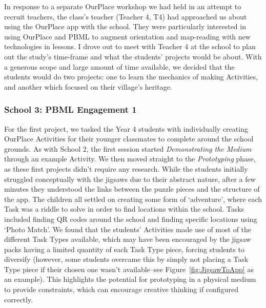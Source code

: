 In response to a separate OurPlace workshop we had held in an attempt to recruit teachers, the class's teacher (Teacher 4, T4) had approached us about using the OurPlace app with the school. They were particularly interested in using OurPlace and PBML to augment orientation and map-reading with new technologies in lessons. I drove out to meet with Teacher 4 at the school to plan out the study's time-frame and what the students' projects would be about. With a generous scope and large amount of time available, we decided that the students would do two projects: one to learn the mechanics of making Activities, and another which focused on their village's heritage. 

\subsubsection{School 3: PBML Engagement 1}
For the first project, we tasked the Year 4 students with individually creating OurPlace Activities for their younger classmates to complete around the school grounds. As with School 2, the first session started \textit{Demonstrating the Medium} through an example Activity. We then moved straight to the \textit{Prototyping} phase, as these first projects didn't require any research. While the students initially struggled conceptually with the jigsaws due to their abstract nature, after a few minutes they understood the links between the puzzle pieces and the structure of the app. The children all settled on creating some form of `adventure', where each Task was a riddle to solve in order to find locations within the school. Tasks included finding QR codes around the school and finding specific locations using `Photo Match'. We found that the students' Activities made use of most of the different Task Types available, which may have been encouraged by the jigsaw packs having a limited quantity of each Task Type piece, forcing students to diversify (however, some students overcame this by simply not placing a Task Type piece if their chosen one wasn't available--see Figure~\ref{fig:JigsawToApp} as an example). This highlights the potential for prototyping in a physical medium to provide constraints, which can encourage creative thinking if configured correctly.

